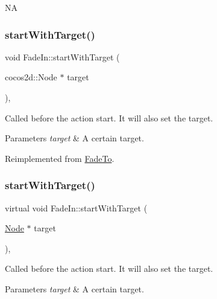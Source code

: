 NA \mbox{\label{classFadeIn_a3a1c5c7aa1b80845aceeeb06ed059fad}} 
\subsubsection{\texorpdfstring{start\+With\+Target()}{startWithTarget()}\hspace{0.1cm}{\footnotesize\ttfamily [1/2]}}
{\footnotesize\ttfamily void Fade\+In\+::start\+With\+Target (\begin{DoxyParamCaption}\item[{cocos2d\+::\+Node $\ast$}]{target }\end{DoxyParamCaption})\hspace{0.3cm}{\ttfamily [override]}, {\ttfamily [virtual]}}

Called before the action start. It will also set the target.


\begin{DoxyParams}{Parameters}
{\em target} & A certain target. \\
\hline
\end{DoxyParams}


Reimplemented from \hyperlink{classFadeTo_a7846758ff3760d099ca70c279c52bde0}{Fade\+To}.

\mbox{\label{classFadeIn_ad97831da7a732a749d87634343e1711d}} 
\subsubsection{\texorpdfstring{start\+With\+Target()}{startWithTarget()}\hspace{0.1cm}{\footnotesize\ttfamily [2/2]}}
{\footnotesize\ttfamily virtual void Fade\+In\+::start\+With\+Target (\begin{DoxyParamCaption}\item[{\hyperlink{classNode}{Node} $\ast$}]{target }\end{DoxyParamCaption})\hspace{0.3cm}{\ttfamily [override]}, {\ttfamily [virtual]}}

Called before the action start. It will also set the target.


\begin{DoxyParams}{Parameters}
{\em target} & A certain target. \\
\hline
\end{DoxyParams}


